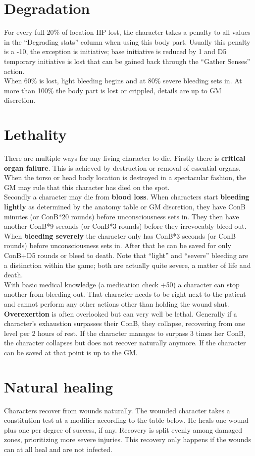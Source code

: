 \documentclass[12pt,a4paper,openany]{book}
\begin{document}
	\section{Degradation}
	For every full 20\% of location HP lost, the character takes a penalty to all values in the “Degrading stats” column when using this body part. Usually this penalty is a -10, the exception is initiative; base initiative is reduced by 1 and D5 temporary initiative is lost that can be gained back through the “Gather Senses” action.\\
	When 60\% is lost, light bleeding begins and at 80\% severe bleeding sets in. At more than 100\% the body part is lost or crippled, details are up to GM discretion.
	\section{Lethality}
	There are multiple ways for any living character to die. 
	Firstly there is \textbf{critical organ failure}. This is achieved by destruction or removal of essential organs. When the torso or head body location is destroyed in a spectacular fashion, the GM may rule that this character has died on the spot.\\
	Secondly a character may die from \textbf{blood loss}. When characters start \textbf{bleeding lightly} as determined by the anatomy table or GM discretion, they have ConB minutes (or ConB*20 rounds) before unconsciousness sets in. They then have another ConB*9 seconds (or ConB*3 rounds) before they irrevocably bleed out. When \textbf{bleeding severely} the character only has ConB*3 seconds (or ConB rounds) before unconsciousness sets in. After that he can be saved for only ConB+D5 rounds or bleed to death. Note that “light” and “severe” bleeding are a distinction within the game; both are actually quite severe, a matter of life and death.\\
	With basic medical knowledge (a medication check +50) a character can stop another from bleeding out. That character needs to be right next to the patient and cannot perform any other actions other than holding the wound shut.\\
	\textbf{Overexertion} is often overlooked but can very well be lethal. Generally if a character’s exhaustion surpasses their ConB, they collapse, recovering from one level per 2 hours of rest. If the character manages to surpass 3 times her ConB, the character collapses but does not recover naturally anymore. If the character can be saved at that point is up to the GM.
	\section{Natural healing}
	Characters recover from wounds naturally. The wounded character takes a constitution test at a modifier according to the table below. He heals one wound plus one per degree of success, if any. Recovery is split evenly among damaged zones, prioritizing more severe injuries. This recovery only happens if the wounds can at all heal and are not infected.
\end{document}
